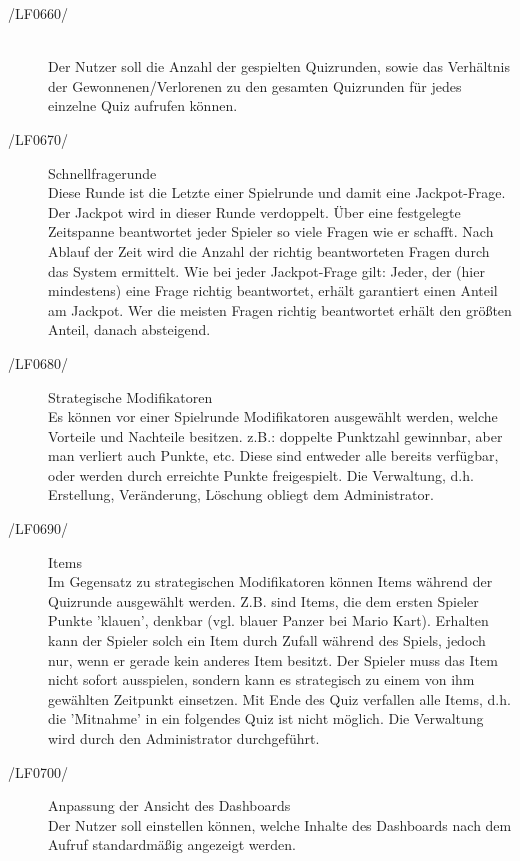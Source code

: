 \documentclass[11pt,a4paper]{scrreprt}
\begin{document}
\begin{description}
\item[/LF0660/]\ \\
Der Nutzer soll die Anzahl der gespielten Quizrunden, sowie das Verhältnis der Gewonnenen/Verlorenen zu den gesamten Quizrunden für jedes einzelne Quiz aufrufen können.

\item[/LF0670/] Schnellfragerunde \\
Diese Runde ist die Letzte einer Spielrunde und damit eine Jackpot-Frage. Der Jackpot wird in dieser Runde verdoppelt.
Über eine festgelegte Zeitspanne beantwortet jeder Spieler so viele Fragen wie er schafft. Nach Ablauf der Zeit wird die Anzahl der richtig beantworteten Fragen durch das System ermittelt.
Wie bei jeder Jackpot-Frage gilt: Jeder, der (hier mindestens) eine Frage richtig beantwortet, erhält garantiert einen Anteil am Jackpot. Wer die meisten Fragen richtig beantwortet erhält den größten Anteil, danach absteigend.

\item[/LF0680/] Strategische Modifikatoren \\
Es können vor einer Spielrunde Modifikatoren ausgewählt werden, welche Vorteile und Nachteile besitzen. z.B.: doppelte Punktzahl gewinnbar, aber man verliert auch Punkte, etc.
Diese sind entweder alle bereits verfügbar, oder werden durch erreichte Punkte freigespielt. Die Verwaltung, d.h. Erstellung, Veränderung, Löschung obliegt dem Administrator.

\item[/LF0690/] Items \\
Im Gegensatz zu strategischen Modifikatoren können Items während der Quizrunde ausgewählt werden. Z.B. sind Items, die dem ersten Spieler Punkte 'klauen', denkbar (vgl. blauer Panzer bei Mario Kart). Erhalten kann der Spieler solch ein Item durch Zufall während des Spiels, jedoch nur, wenn er gerade kein anderes Item besitzt. Der Spieler muss das Item nicht sofort ausspielen, sondern kann es strategisch zu einem von ihm gewählten Zeitpunkt einsetzen. Mit Ende des Quiz verfallen alle Items, d.h. die 'Mitnahme' in ein folgendes Quiz ist nicht möglich. Die Verwaltung wird durch den Administrator durchgeführt.
\end{description}

\begin{description}
\item[/LF0700/] Anpassung der Ansicht des Dashboards \\
Der Nutzer soll einstellen können, welche Inhalte des Dashboards nach dem Aufruf standardmäßig angezeigt werden.

\end{description}
\end{document}
